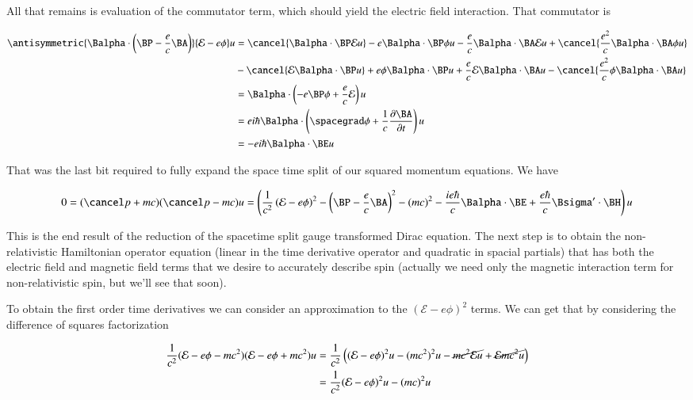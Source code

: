 All that remains is evaluation of the commutator term, which should yield the electric field interaction.  That commutator is

\begin{align*}
\antisymmetric{
\Balpha \cdot \left(\BP - \frac{e}{c} \BA \right)
}
{
\mathcal{E} - e \phi
} u
&=
\cancel{\Balpha \cdot \BP \mathcal{E} u}
- e \Balpha \cdot \BP \phi u
- \frac{e}{c} \Balpha \cdot \BA \mathcal{E} u
+ \cancel{\frac{e^2}{c} \Balpha \cdot \BA \phi u} \\
&
- \cancel{\mathcal{E} \Balpha \cdot \BP u}
+ e \phi \Balpha \cdot \BP u
+ \frac{e}{c} \mathcal{E} \Balpha \cdot \BA u
- \cancel{\frac{e^2}{c} \phi \Balpha \cdot \BA u} \\
&=
\Balpha \cdot \left( - e \BP \phi
+ \frac{e}{c} \mathcal{E} \right) u \\
&=
e i \hbar \Balpha \cdot \left( \spacegrad \phi
+ \frac{1}{c} \PD{t}{\BA} \right) u \\
&=
- e i \hbar \Balpha \cdot \BE u
\end{align*}

That was the last bit required to fully expand the space time split of our squared momentum equations.  We have

\begin{equation}\label{eqn:diracGauge:400}
0
=
(\pslash + mc)(\pslash - mc) u
=
\left(
\inv{c^2} \left( \mathcal{E} - e \phi \right)^2
- \left(\BP - \frac{e}{c} \BA \right)^2
- (mc)^2
- \frac{i e \hbar}{c} \Balpha \cdot \BE
+ \frac{e \hbar}{c} \Bsigma' \cdot \BH
\right) u
\end{equation}

This is the end result of the reduction of the spacetime split gauge transformed Dirac equation.  The next step is to obtain the non-relativistic Hamiltonian operator equation (linear in the time derivative operator and quadratic in spacial partials) that has both the electric field and magnetic field terms that we desire to accurately describe spin (actually we need only the magnetic interaction term for non-relativistic spin, but we'll see that soon).

To obtain the first order time derivatives we can consider an approximation to the $(\mathcal{E} - e \phi)^2$ terms.  We can get that by considering the difference of squares factorization

\begin{align*}
\frac{1}{c^2} ( \mathcal{E} - e \phi - m c^2) ( \mathcal{E} - e \phi + m c^2) u
&=
\frac{1}{c^2} \left(
( \mathcal{E} - e \phi )^2 u - (m c^2)^2 u
- \cancel{m c^2 \mathcal{E} u}
+ \cancel{\mathcal{E} m c^2 u} \right) \\
&=
\frac{1}{c^2} ( \mathcal{E} - e \phi )^2 u - (m c)^2 u
\end{align*}

